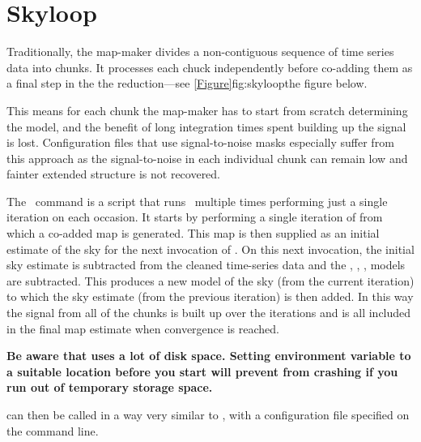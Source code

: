 \section{Skyloop}
\label{sec:skyloop}


Traditionally, the map-maker divides a non-contiguous sequence of time
series data into chunks. It processes each chuck independently
before co-adding them as a final step in the the reduction---see
\cref{Figure}{fig:skyloop}{the figure below}.

This means for each chunk the map-maker has to start from scratch
determining the  model, and the benefit of long integration
times spent building up the signal is lost. Configuration files that use
signal-to-noise masks especially suffer from this approach as the
signal-to-noise in each individual chunk can remain low and fainter
extended structure is not recovered.

The \skyloop\ command is a script that runs \makemap\ multiple times
performing just a single iteration on each occasion. It starts by
performing a single iteration of  from which a
co-added map is generated. This map is then supplied as an initial
estimate of the sky for the next invocation of . On
this next invocation, the initial sky estimate is subtracted from the
cleaned time-series data and the , ,
,  models are subtracted. This produces a new
model of the sky (from the current iteration) to which the sky
estimate (from the previous iteration) is then added. In this way the
signal from all of the chunks is built up over the iterations and is
all included in the final map estimate when convergence is reached.




\textbf{Be aware that  uses a lot of disk space. Setting
environment variable  to a suitable location
before you start will prevent  from crashing
if you run out of temporary storage space.}
\begin{terminalv}
\end{terminalv}
 can then be called in a way very similar to \makemap, with
a configuration file specified on the command line.
\begin{terminalv}
\end{terminalv}

